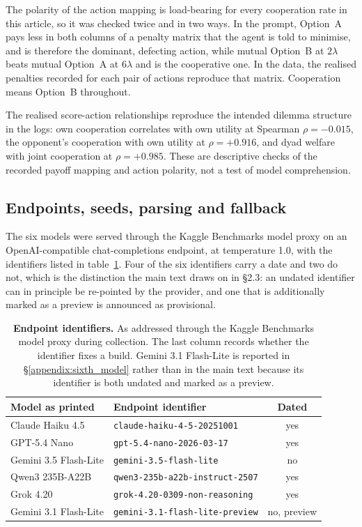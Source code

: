 \documentclass[11pt,a4paper]{article}
\newcommand{\lam}{\lambda}
\begin{document}
The polarity of the action mapping is load-bearing for every cooperation rate in this article, so it was checked twice and in two ways. In the prompt, Option~A pays less in both columns of a penalty matrix that the agent is told to minimise, and is therefore the dominant, defecting action, while mutual Option~B at $2\lam$ beats mutual Option~A at $6\lam$ and is the cooperative one. In the data, the realised penalties recorded for each pair of actions reproduce that matrix. Cooperation means Option~B throughout.

The realised score-action relationships reproduce the intended dilemma structure in the logs: own cooperation correlates with own utility at Spearman $\rho = -0.015$, the opponent's cooperation with own utility at $\rho = +0.916$, and dyad welfare with joint cooperation at $\rho = +0.985$. These are descriptive checks of the recorded payoff mapping and action polarity, not a test of model comprehension.

\subsection{Endpoints, seeds, parsing and fallback}\label{appendix:endpoints}

The six models were served through the Kaggle Benchmarks model proxy on an OpenAI-compatible chat-completions endpoint, at temperature 1.0, with the identifiers listed in table~\ref{tab:A-endpoints}. Four of the six identifiers carry a date and two do not, which is the distinction the main text draws on in \S2.3: an undated identifier can in principle be re-pointed by the provider, and one that is additionally marked as a preview is announced as provisional.

\begin{table}[htbp]
\centering
\footnotesize
\caption{\textbf{Endpoint identifiers.} As addressed through the Kaggle Benchmarks model proxy during collection. The last column records whether the identifier fixes a build. Gemini 3.1 Flash-Lite is reported in \S\ref{appendix:sixth_model} rather than in the main text because its identifier is both undated and marked as a preview.}
\label{tab:A-endpoints}
\begin{tabular}{@{}llc@{}}
\toprule
Model as printed & Endpoint identifier & Dated \\
\midrule
Claude Haiku 4.5      & \texttt{claude-haiku-4-5-20251001}      & yes \\
GPT-5.4 Nano          & \texttt{gpt-5.4-nano-2026-03-17}        & yes \\
Gemini 3.5 Flash-Lite & \texttt{gemini-3.5-flash-lite}          & no  \\
Qwen3 235B-A22B       & \texttt{qwen3-235b-a22b-instruct-2507}  & yes \\
Grok 4.20             & \texttt{grok-4.20-0309-non-reasoning}   & yes \\
Gemini 3.1 Flash-Lite & \texttt{gemini-3.1-flash-lite-preview}  & no, preview \\
\bottomrule
\end{tabular}
\end{table}
\end{document}
